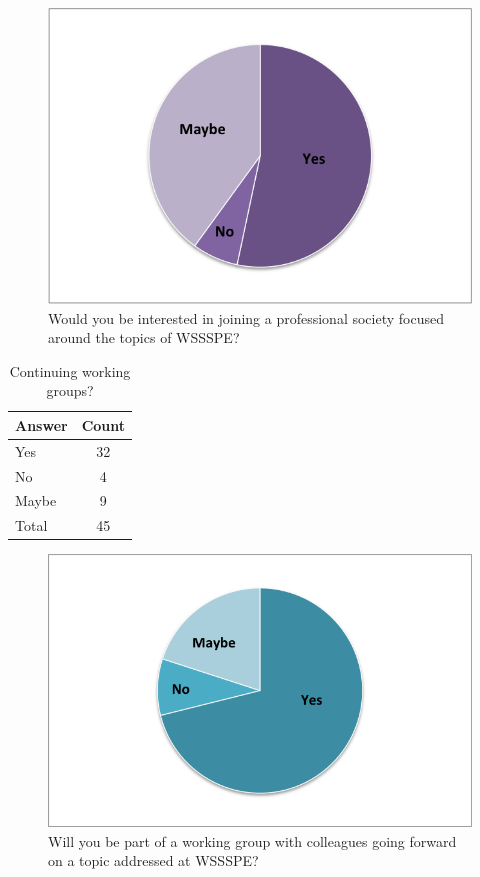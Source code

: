 \begin{figure}[h]
\includegraphics{figures/SurveyFig5}
\caption{Would you be interested in joining a professional society focused around the topics of WSSSPE?
\label{fig:SFig5}}
\end{figure}




\begin{table}[h!]
\centering
\caption{Continuing working groups?}
\label{tab:survey_continuing_wgs}
\begin{tabular}{|l|c|}
\hline
{\bf Answer} &
{\bf Count} \\ \hline
Yes &
32 \\
No &
4 \\
Maybe &
9 \\
Total &
45 \\
\hline
\end{tabular}
\end{table}

\begin{figure}[h]
\includegraphics{figures/SurveyFig6}
\caption{Will you be part of a working group  with colleagues going forward  on a topic addressed at WSSSPE?
\label{fig:SFig6}}
\end{figure}

